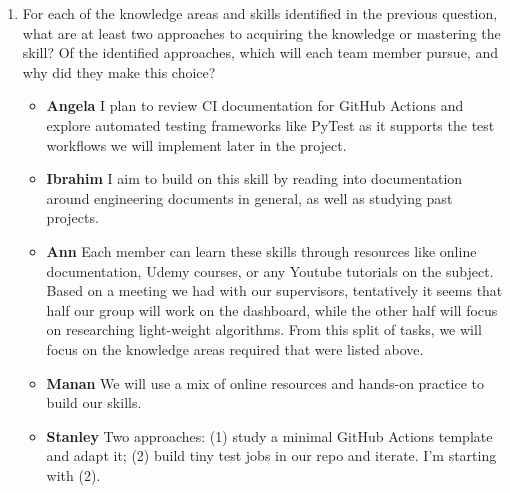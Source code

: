 \documentclass[12pt, titlepage]{article}
\begin{document}
\begin{enumerate}
  \item For each of the knowledge areas and skills identified in the previous
  question, what are at least two approaches to acquiring the knowledge or
  mastering the skill?  Of the identified approaches, which will each team
  member pursue, and why did they make this choice?
  \begin{itemize}
      \item \textbf{Angela} I plan to review CI documentation for GitHub Actions and explore automated testing frameworks like PyTest as it supports the test workflows we will implement later in the project.
      \item \textbf{Ibrahim} I aim to build on this skill by reading into documentation around engineering documents in general, as well as studying past projects.
      \item \textbf{Ann} Each member can learn these skills through resources like online documentation, Udemy courses, or any Youtube tutorials on the subject. Based on a meeting we had with our supervisors, tentatively it seems that half our group will work on the dashboard, while the other half will focus on researching light-weight algorithms. From this split of tasks, we will focus on the knowledge areas required that were listed above.
      \item \textbf{Manan} We will use a mix of online resources and hands-on practice to build our skills.
      \item \textbf{Stanley} Two approaches: (1) study a minimal GitHub Actions template and adapt it; (2) build tiny test jobs in our repo and iterate. I’m starting with (2).
    \end{itemize}

\end{enumerate}
\end{document}
